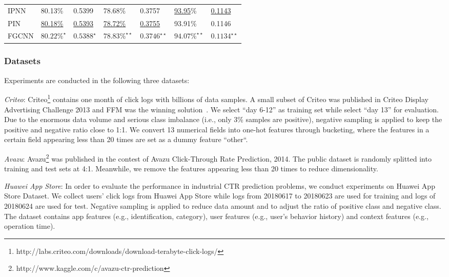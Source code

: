 \begin{table*}[t]
{\begin{tabular}{lll|ll|ll}
\multicolumn{1}{l|}{IPNN}    & 80.13\%             & \multicolumn{1}{l|}{0.5399}             & 78.68\%                  & \multicolumn{1}{l|}{0.3757}                 & \underline{93.95}\%                  & \underline{0.1143}                  \\
\multicolumn{1}{l|}{PIN}     & \underline{80.18\%}\footnotemark[11] & \multicolumn{1}{l|}{\underline{0.5393}} & \underline{78.72\%}      & \multicolumn{1}{l|}{\underline{0.3755}}     & 93.91\%      & 0.1146      \\ \hline
\multicolumn{1}{l|}{FGCNN}   & $\mathbf{80.22\%}^\star$     & \multicolumn{1}{l|}{$\mathbf{0.5388}^\star$}    & $\mathbf{78.83\%^{\star\star}}$ & \multicolumn{1}{l|}{$\mathbf{0.3746^{\star\star}}$} & $\mathbf{94.07\%^{\star\star}}$ & $\mathbf{0.1134^{\star\star}}$\\ \hline\hline
\end{tabular}
}
\vspace{-3ex}
\end{table*}


\subsubsection{Datasets} Experiments are conducted in the following three datasets:

\textit{Criteo}: Criteo\footnote{http://labs.criteo.com/downloads/download-terabyte-click-logs/} contains one month of click logs with billions of data samples. A small subset of Criteo was published in Criteo Display Advertising Challenge 2013 and FFM was the winning solution~\cite{pin, ffm}. We select ``day 6-12'' as training set while select ``day 13'' for evaluation. Due to the enormous data volume and serious class imbalance (i.e., only 3\% samples are positive), negative sampling is applied to keep the positive and negative ratio close to 1:1. We convert 13 numerical fields into one-hot features through bucketing, where the features in a certain field appearing less than 20 times are set as a dummy feature ``other``.

\textit{Avazu}: Avazu\footnote{http://www.kaggle.com/c/avazu-ctr-prediction} was published in the contest of Avazu Click-Through Rate Prediction, 2014. The public dataset is randomly splitted into training and test sets at 4:1. Meanwhile, we remove the features appearing less than 20 times to reduce dimensionality.

\textit{Huawei App Store}: In order to evaluate the performance in industrial CTR prediction problems, we conduct experiments on Huawei App Store Dataset. We collect users' click logs from Huawei App Store while logs from 20180617 to 20180623 are used for training and logs of 20180624 are used for test. Negative sampling is applied to reduce data amount and to adjust the ratio of positive class and negative class. The dataset contains app features (e.g., identification, category), user features (e.g., user's behavior history) and context features (e.g., operation time).




